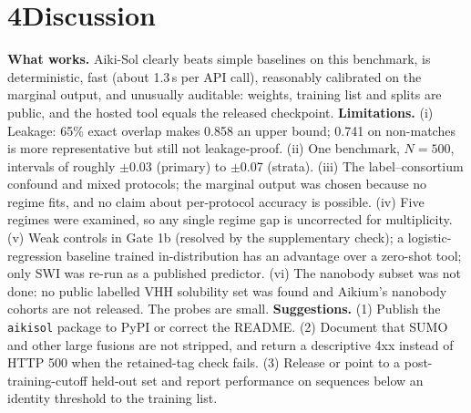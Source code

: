 \documentclass[10pt]{article}
\begin{document}
\section*{4\quad Discussion}
\textbf{What works.} Aiki-Sol clearly beats simple baselines on this benchmark, is deterministic, fast (about 1.3\,s per API call), reasonably calibrated on the marginal output, and unusually auditable: weights, training list and splits are public, and the hosted tool equals the released checkpoint. \textbf{Limitations.} (i) Leakage: 65\% exact overlap makes 0.858 an upper bound; 0.741 on non-matches is more representative but still not leakage-proof. (ii) One benchmark, $N{=}500$, intervals of roughly $\pm$0.03 (primary) to $\pm$0.07 (strata). (iii) The label--consortium confound and mixed protocols; the marginal output was chosen because no regime fits, and no claim about per-protocol accuracy is possible. (iv) Five regimes were examined, so any single regime gap is uncorrected for multiplicity. (v) Weak controls in Gate 1b (resolved by the supplementary check); a logistic-regression baseline trained in-distribution has an advantage over a zero-shot tool; only SWI was re-run as a published predictor. (vi) The nanobody subset was not done: no public labelled VHH solubility set was found and Aikium's nanobody cohorts are not released. The probes are small. \textbf{Suggestions.} (1) Publish the \texttt{aikisol} package to PyPI or correct the README. (2) Document that SUMO and other large fusions are not stripped, and return a descriptive 4xx instead of HTTP 500 when the retained-tag check fails. (3) Release or point to a post-training-cutoff held-out set and report performance on sequences below an identity threshold to the training list.
\end{document}
